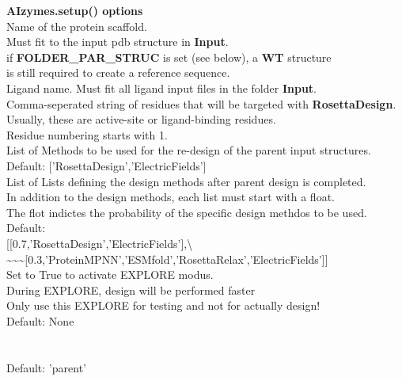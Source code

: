 \documentclass[10pt]{extarticle}
\begin{document}
\textbf{AIzymes.setup() options}\\
 Name of the protein scaffold.\\
\makebox[3.5cm][l]{} Must fit to the input pdb structure in \textbf{Input}.\\
\makebox[3.5cm][l]{} if \textbf{FOLDER\_PAR\_STRUC} is set (see below), a \textbf{WT} structure\\
\makebox[3.5cm][l]{} is still required to create a reference sequence.\\
 Ligand name. Must fit all ligand input files in the folder \textbf{Input}.\\
 Comma-seperated string of residues that will be targeted with \textbf{RosettaDesign}.\\
\makebox[3.5cm][l]{} Usually, these are active-site or ligand-binding residues.\\
\makebox[3.5cm][l]{} Residue numbering starts with 1.\\
 List of Methods to be used for the re-design of the parent input structures.\\
\makebox[3.5cm][l]{} Default: ['RosettaDesign','ElectricFields']\\
 List of Lists defining the design methods after parent design is completed.\\
\makebox[3.5cm][l]{} In addition to the design methods, each list must start with a float.\\
\makebox[3.5cm][l]{} The flot indictes the probability of the specific design methdos to be used.\\
\makebox[3.5cm][l]{} Default: \\
\makebox[3.5cm][l]{} [[0.7,'RosettaDesign','ElectricFields'],\textbackslash{}\\
\makebox[3.5cm][l]{} \textasciitilde{}\textasciitilde{}\textasciitilde{}[0.3,'ProteinMPNN','ESMfold','RosettaRelax','ElectricFields']]\\
 Set to True to activate EXPLORE modus.\\
\makebox[3.5cm][l]{} During EXPLORE, design will be performed faster\\
\makebox[3.5cm][l]{} Only use this EXPLORE for testing and not for actually design!\\
\makebox[3.5cm][l]{} Default: None\\
 \\
 \\
\makebox[3.5cm][l]{} Default: 'parent'\\
 \\
\end{document}
